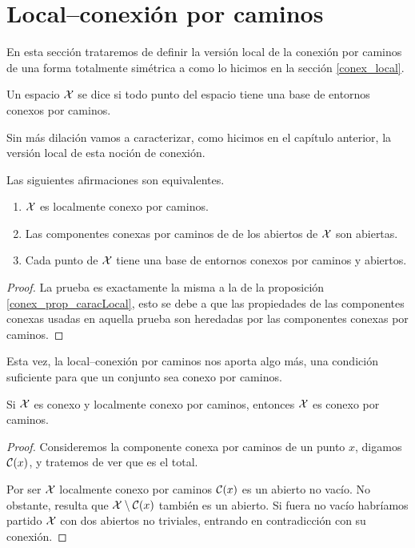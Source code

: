 \section{Local--conexión por caminos}
En esta sección trataremos de definir la versión local de la conexión por caminos de una forma totalmente simétrica a como lo hicimos en la sección \ref{conex_local}.
\begin{defi}
	Un espacio $\mathcal{X}$ se dice  si todo punto del espacio tiene una base de entornos conexos por caminos.
\end{defi}
Sin más dilación vamos a caracterizar, como hicimos en el capítulo anterior, la versión local de esta noción de conexión.
\begin{lem}[Caracterización]
	Las siguientes afirmaciones son equivalentes.
	\begin{enumerate}
		\item $\mathcal{X}$ es localmente conexo por caminos.
		\item Las componentes conexas por caminos de de los abiertos de $\mathcal{X}$ son abiertas.
		\item Cada punto de $\mathcal{X}$ tiene una base de entornos conexos por caminos y abiertos.
	\end{enumerate}
\end{lem}
\begin{proof}
	La prueba es exactamente la misma a la de la proposición \ref{conex_prop_caracLocal}, esto se debe a que las propiedades de las componentes conexas usadas en aquella prueba son heredadas por las componentes conexas por caminos.
\end{proof}
Esta vez, la local--conexión por caminos nos aporta algo más, una condición suficiente para que un conjunto sea conexo por caminos.
\begin{prop}
	Si $\mathcal{X}$ es conexo y localmente conexo por caminos, entonces $\mathcal{X}$ es conexo por caminos.
\end{prop}
\begin{proof}
	Consideremos la componente conexa por caminos de un punto $x$, digamos $\mathcal{C}(x)$, y tratemos de ver que es el total.
	
	Por ser $\mathcal{X}$ localmente conexo por caminos $\mathcal{C}(x)$ es un abierto no vacío. No obstante, resulta que $\mathcal{X}\setminus \mathcal{C}(x)$ también es un abierto. Si fuera no vacío habríamos partido $\mathcal{X}$ con dos abiertos no triviales, entrando en contradicción con su conexión. 
\end{proof}
